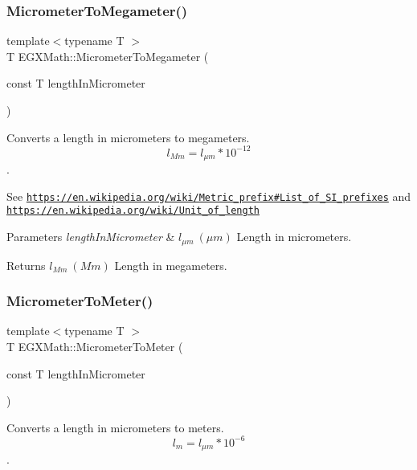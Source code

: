 \subsubsection{\texorpdfstring{Micrometer\+To\+Megameter()}{MicrometerToMegameter()}}
{\footnotesize\ttfamily template$<$typename T $>$ \\
T E\+G\+X\+Math\+::\+Micrometer\+To\+Megameter (\begin{DoxyParamCaption}\item[{const T}]{length\+In\+Micrometer }\end{DoxyParamCaption})}



Converts a length in micrometers to megameters. \[ l_{Mm}=l_{\mu m} * 10^{-12} \]. 

See \href{https://en.wikipedia.org/wiki/Metric_prefix#List_of_SI_prefixes}{\tt https\+://en.\+wikipedia.\+org/wiki/\+Metric\+\_\+prefix\#\+List\+\_\+of\+\_\+\+S\+I\+\_\+prefixes} and \href{https://en.wikipedia.org/wiki/Unit_of_length}{\tt https\+://en.\+wikipedia.\+org/wiki/\+Unit\+\_\+of\+\_\+length} 
\begin{DoxyParams}{Parameters}
{\em length\+In\+Micrometer} & $ l_{\mu m}\ (\mu m)$ Length in micrometers. \\
\hline
\end{DoxyParams}
\begin{DoxyReturn}{Returns}
$ l_{Mm}\ (Mm)$ Length in megameters. 
\end{DoxyReturn}
\mbox{\label{group___e_g_x_math-_conversions-_length_conversions-_micrometer-_s_i_ga20cc456329c53dfb121348e03e8b282d}} 
\subsubsection{\texorpdfstring{Micrometer\+To\+Meter()}{MicrometerToMeter()}}
{\footnotesize\ttfamily template$<$typename T $>$ \\
T E\+G\+X\+Math\+::\+Micrometer\+To\+Meter (\begin{DoxyParamCaption}\item[{const T}]{length\+In\+Micrometer }\end{DoxyParamCaption})}



Converts a length in micrometers to meters. \[ l_{m}=l_{\mu m} * 10^{-6}\]. 


